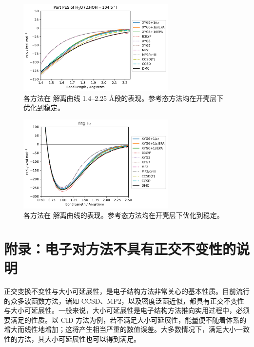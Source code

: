 \begin{figure}[!h]
  \centering
  \includegraphics[width=0.7\textwidth]{assets/curve-H2O-part-stab.pdf}
  \caption[ 解离曲线 1.4--2.25 \AA 段表现 (开壳层)]{各方法在  解离曲线 1.4--2.25 \AA 段的表现。参考态方法均在开壳层下优化到稳定。}
  \label{fig.2.curve-H2O-part-stab}
\end{figure}

\begin{figure}[!h]
  \centering
  \includegraphics[width=0.7\textwidth]{assets/curve-H6-stab.pdf}
  \caption[ 解离曲线表现 (开壳层)]{各方法在  解离曲线的表现。参考态方法均在开壳层下优化到稳定。}
  \label{fig.2.curve-H6-stab}
\end{figure}

\pagebreak

\section{附录：电子对方法不具有正交不变性的说明}

正交变换不变性与大小可延展性，是电子结构方法非常关心的基本性质。目前流行的众多波函数方法，诸如 CCSD、MP2，以及密度泛函近似，都具有正交不变性与大小可延展性。一般来说，大小可延展性是电子结构方法推向实用过程中，必须要满足的性质。以 CID 方法为例，若不满足大小可延展性，能量便不随着体系的增大而线性地增加；这将产生相当严重的数值误差。大多数情况下，满足大小一致性的方法，其大小可延展性也可以得到满足。

